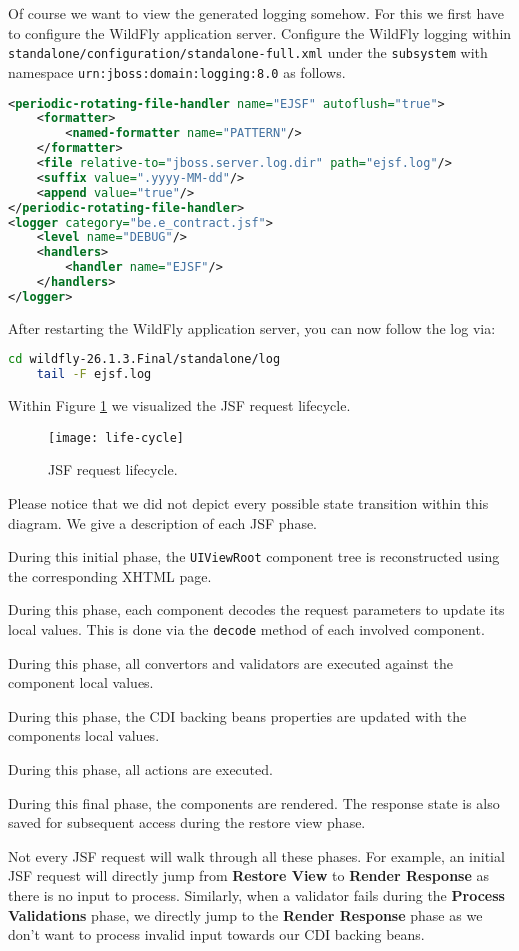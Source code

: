 Of course we want to view the generated logging somehow.
For this we first have to configure the WildFly application server.
Configure the WildFly logging within \texttt{standalone/configuration/standalone-full.xml} under the \texttt{subsystem} with namespace \texttt{urn:jboss:domain:logging:8.0} as follows.
\begin{lstlisting}[language=XML]
<periodic-rotating-file-handler name="EJSF" autoflush="true">
	<formatter>
		<named-formatter name="PATTERN"/>
	</formatter>
	<file relative-to="jboss.server.log.dir" path="ejsf.log"/>
	<suffix value=".yyyy-MM-dd"/>
	<append value="true"/>
</periodic-rotating-file-handler>
<logger category="be.e_contract.jsf">
	<level name="DEBUG"/>
	<handlers>
		<handler name="EJSF"/>
	</handlers>
</logger>
\end{lstlisting}
After restarting the WildFly application server, you can now follow the log via:
\begin{lstlisting}[language=bash]
	cd wildfly-26.1.3.Final/standalone/log
	tail -F ejsf.log
\end{lstlisting}
Within Figure \ref{fig:life-cycle} we visualized the JSF request lifecycle.
\begin{figure}[htbp]
	\begin{center}
		\texttt{[image: life-cycle]}
		\caption{JSF request lifecycle.}
		\label{fig:life-cycle}
	\end{center}
\end{figure}
Please notice that we did not depict every possible state transition within this diagram.
We give a description of each JSF phase.
\begin{description}[style=nextline]
	\item[Restore View]
	During this initial phase, the \texttt{UIViewRoot} component tree is reconstructed using the corresponding XHTML page.
	\item[Apply Request Values]
	During this phase, each component decodes the request parameters to update its local values.
	This is done via the \texttt{decode} method of each involved component.
	\item[Process Validations]
	During this phase, all convertors and validators are executed against the component local values.
	\item[Update Model Values]
	During this phase, the CDI backing beans properties are updated with the components local values.
	\item[Invoke Application]
	During this phase, all actions are executed.
	\item[Render Response]
	During this final phase, the components are rendered.
	The response state is also saved for subsequent access during the restore view phase.
\end{description}
Not every JSF request will walk through all these phases. For example, an initial JSF request will directly jump from \textbf{Restore View} to \textbf{Render Response} as there is no input to process.
Similarly, when a validator fails during the \textbf{Process Validations} phase, we directly jump to the \textbf{Render Response} phase as we don't want to process invalid input towards our CDI backing beans.

